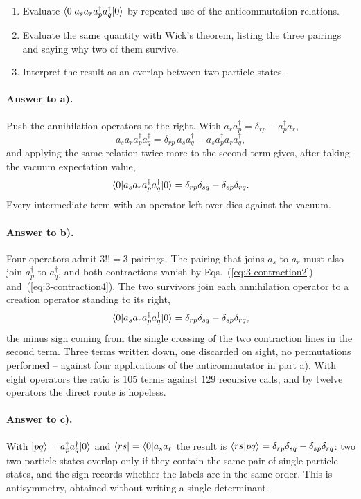 \begin{enumerate}
  \item[a)] Evaluate $\langle 0 \vert a_sa_ra_p^{\dagger}a_q^{\dagger}\vert 0 \rangle$ by
  repeated use of the anticommutation relations.
  \item[b)] Evaluate the same quantity with Wick's theorem, listing the three
  pairings and saying why two of them survive.
  \item[c)] Interpret the result as an overlap between two-particle states.
\end{enumerate}

\paragraph{Answer to a).}
Push the annihilation operators to the right.  With
$a_ra_p^{\dagger}=\delta_{rp}-a_p^{\dagger}a_r$,
\[
  a_sa_ra_p^{\dagger}a_q^{\dagger}
   = \delta_{rp}\,a_sa_q^{\dagger}
     - a_sa_p^{\dagger}a_ra_q^{\dagger} ,
\]
and applying the same relation twice more to the second term gives, after
taking the vacuum expectation value,
\[
  \langle 0 \vert a_sa_ra_p^{\dagger}a_q^{\dagger}\vert 0 \rangle
   = \delta_{rp}\delta_{sq} - \delta_{sp}\delta_{rq} .
\]
Every intermediate term with an operator left over dies against the vacuum.

\paragraph{Answer to b).}
Four operators admit $3!!=3$ pairings.  The pairing that joins $a_s$ to $a_r$
must also join $a_p^{\dagger}$ to $a_q^{\dagger}$, and both contractions
vanish by Eqs.~(\ref{eq:3-contraction2}) and~(\ref{eq:3-contraction4}).  The
two survivors join each annihilation operator to a creation operator standing
to its right,
\[
  \langle 0 \vert a_sa_ra_p^{\dagger}a_q^{\dagger}\vert 0 \rangle
   = \delta_{rp}\delta_{sq} - \delta_{sp}\delta_{rq} ,
\]
the minus sign coming from the single crossing of the two contraction lines
in the second term.  Three terms written down, one discarded on sight, no
permutations performed -- against four applications of the anticommutator in
part a).  With eight operators the ratio is $105$ terms against $129$
recursive calls, and by twelve operators the direct route is hopeless.

\paragraph{Answer to c).}
With $\vert pq \rangle=a_p^{\dagger}a_q^{\dagger}\vert 0 \rangle$ and
$\langle rs \vert=\langle 0 \vert a_sa_r$ the result is
$\langle rs \vert pq \rangle=\delta_{rp}\delta_{sq}-\delta_{sp}\delta_{rq}$: two
two-particle states overlap only if they contain the same pair of
single-particle states, and the sign records whether the labels are in the
same order.  This is antisymmetry, obtained without writing a single
determinant.

